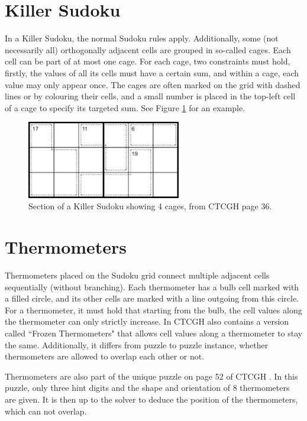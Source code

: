 \section{Killer Sudoku}
In a Killer Sudoku, the normal Sudoku rules apply. Additionally, some (not necessarily all) orthogonally adjacent cells are grouped in so-called cages. Each cell can be part of at most one cage. For each cage, two constraints must hold, firstly, the values of all its cells must have a certain sum, and within a cage, each value may only appear once. The cages are often marked on the grid with dashed lines or by colouring their cells, and a small number is placed in the top-left cell of a cage to specify its targeted sum. See Figure \ref{fig:exampleKiller} for an example.

\begin{figure}
\centering
\includegraphics[width=0.6\textwidth]{Figures/Killer Example (CTC page 36).png}
\caption{Section of a Killer Sudoku showing 4 cages, from CTCGH \cite{CrackingTheCryptic2021} page 36.}
\label{fig:exampleKiller}
\end{figure}

\section{Thermometers}
Thermometers placed on the Sudoku grid connect multiple adjacent cells sequentially (without branching). Each thermometer has a bulb cell marked with a filled circle, and its other cells are marked with a line outgoing from this circle. For a thermometer, it must hold that starting from the bulb, the cell values along the thermometer can only strictly increase. In CTCGH \cite{CrackingTheCryptic2021} also contains a version called ``Frozen Thermometers" that allows cell values along a thermometer to stay the same. Additionally, it differs from puzzle to puzzle instance, whether thermometers are allowed to overlap each other or not.

Thermometers are also part of the unique puzzle on page 52 of CTCGH \cite{CrackingTheCryptic2021}. In this puzzle, only three hint digits and the shape and orientation of 8 thermometers are given. It is then up to the solver to deduce the position of the thermometers, which can not overlap.

